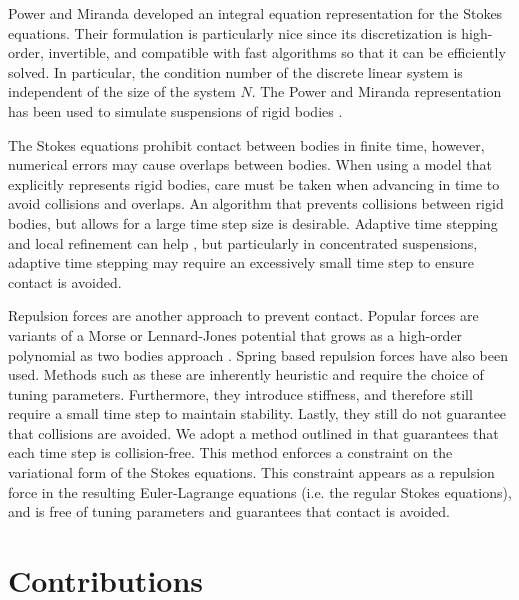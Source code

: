 Power and Miranda \cite{Power1987, Power1993} developed an integral equation representation for the Stokes equations. Their formulation is particularly nice since its discretization is high-order, invertible, and compatible with fast algorithms so that it can be efficiently solved. In particular, the condition number of the discrete linear system is independent of the size of the system $N$. The Power and Miranda representation has been used to simulate suspensions of rigid bodies \cite{Bystricky2018,Corona2017, Tornberg2006}. 

The Stokes equations prohibit contact between bodies in finite time, however, numerical errors may cause overlaps between bodies. When using a model that explicitly represents rigid bodies, care must be taken when advancing in time to avoid collisions and overlaps. An algorithm that prevents collisions between rigid bodies, but allows for a large time step size is desirable. Adaptive time stepping and local refinement can help \cite{Kropinski1999, Quaife2016}, but particularly in concentrated suspensions, adaptive time stepping may require an excessively small time step to ensure contact is avoided. 

Repulsion forces \cite{Flormann2017, Liu2006, Lu2017} are another approach to prevent contact. Popular forces are variants of a Morse or Lennard-Jones potential that grows as a high-order polynomial as two bodies approach \cite{Flormann2017, Liu2006}. Spring based repulsion forces \cite{Kabacogulu2017, Zhao2013} have also been used. Methods such as these are inherently heuristic and require the choice of tuning parameters. Furthermore, they introduce stiffness, and therefore still require a small time step to maintain stability. Lastly, they still do not guarantee that collisions are avoided. We adopt a method outlined in \cite{Lu2017} that guarantees that each time step is collision-free. This method enforces a constraint on the variational form of the Stokes equations. This constraint appears as a repulsion force in the resulting Euler-Lagrange equations (i.e. the regular Stokes equations), and is free of tuning parameters and guarantees that contact is avoided.
 
\section{Contributions}

